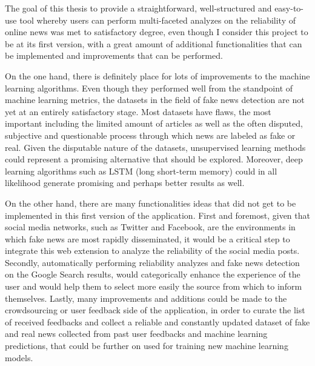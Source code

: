 \documentclass[12pt, a4paper]{article}
\begin{document}
  The goal of this thesis to provide a straightforward, well-structured and easy-to-use tool whereby users can perform multi-faceted analyzes on the reliability of online news was met to satisfactory degree, even though I consider this project to be at its first version, with a great amount of additional functionalities that can be implemented and improvements that can be performed. 
  
  On the one hand, there is definitely place for lots of improvements to the machine learning algorithms. Even though they performed well from the standpoint of machine learning metrics, the datasets in the field of fake news detection are not yet at an entirely satisfactory stage. Most datasets have flaws, the most important including the limited amount of articles as well as the often disputed, subjective and questionable process through which news are labeled as fake or real. Given the disputable nature of the datasets, unsupervised learning methods could represent a promising alternative that should be explored. Moreover, deep learning algorithms such as LSTM (long short-term memory) could in all likelihood generate promising and perhaps better results as well.

  On the other hand, there are many functionalities ideas that did not get to be implemented in this first version of the application. First and foremost, given that social media networks, such as Twitter and Facebook, are the environments in which fake news are most rapidly disseminated, it would be a critical step to integrate this web extension to analyze the reliability of the social media posts. Secondly, automatically performing reliability analyzes and fake news detection on the Google Search results, would categorically enhance the experience of the user and would help them to select more easily the source from which to inform themselves. Lastly, many improvements and additions could be made to the crowdsourcing or user feedback side of the application, in order to curate the list of received feedbacks and collect a reliable and constantly updated dataset of fake and real news collected from past user feedbacks and machine learning predictions, that could be further on used for training new machine learning models.

  \newpage
  
  
  \nocite{*}
\end{document}
